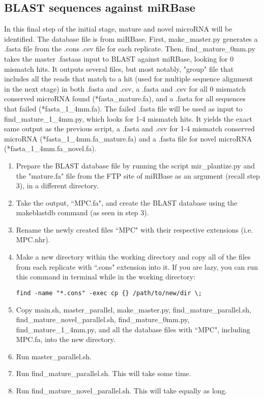 \documentclass[12pt,titlepage]{article}
\begin{document}
\subsection{BLAST sequences against miRBase}
In this final step of the initial stage, mature and novel microRNA will be identified. The database file is from miRBase. First, make\_master.py generates a .fasta file from the .cons .csv file for each replicate. Then, find\_mature\_0mm.py takes the master .fastaas input to BLAST against miRBase, looking for 0 mismatch hits. It outputs several files, but most notably, "group" file that includes all the reads that match to a hit (used for multiple sequence alignment in the next stage) in both .fasta and .csv, a .fasta and .csv for all 0 mismatch conserved microRNA found (*fasta\_mature.fa), and a .fasta for all sequences that failed (*fasta\_1\_4mm.fa). The failed .fasta file will be used as input to find\_mature\_1\_4mm.py, which looks for 1-4 mismatch hits. It yields the exact same output as the previous script, a .fasta and .csv for 1-4 mismatch conserved microRNA (*fasta\_1\_4mm.fa\_mature.fa) and a .fasta file for novel microRNA (*fasta\_1\_4mm.fa\_novel.fa).
\begin{enumerate}
\item Prepare the BLAST database file by running the script mir\_plantize.py and the "mature.fa" file from the FTP site of miRBase as an argument (recall step 3), in a different directory.
\item Take the output, ``MPC.fa", and create the BLAST database using the makeblastdb command (as seen in step 3).
\item Rename the newly created files ``MPC" with their respective extensions (i.e. MPC.nhr).
\item Make a new directory within the working directory and copy all of the files from each replicate with ``.cons" extension into it. If you are lazy, you can run this command in terminal while in the working directory: 
\begin{tcolorbox}
\begin{lstlisting}
find -name "*.cons" -exec cp {} /path/to/new/dir \; 
\end{lstlisting}
\end{tcolorbox}
\item Copy main.sh, master\_parallel, make\_master.py, find\_mature\_parallel.sh, find\_mature\_novel\_parallel.sh, find\_mature\_0mm.py, find\_mature\_1\_4mm.py, and all the database files with ``MPC", including MPC.fa, into the new directory.
\item Run master\_parallel.sh.
\item Run find\_mature\_parallel.sh. This will take some time.
\item Run find\_mature\_novel\_parallel.sh. This will take equally as long.
\end{enumerate}
\end{document}
